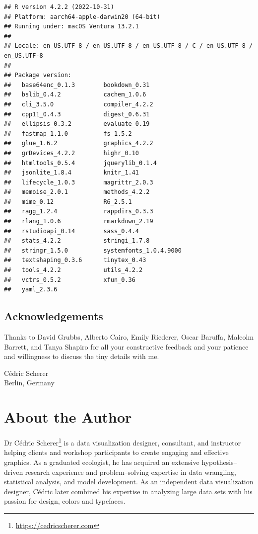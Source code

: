 \documentclass[
]{krantz}
\renewcommand{\href}[2]{#2\footnote{\url{#1}}}
\begin{document}
\begin{verbatim}
## R version 4.2.2 (2022-10-31)
## Platform: aarch64-apple-darwin20 (64-bit)
## Running under: macOS Ventura 13.2.1
## 
## Locale: en_US.UTF-8 / en_US.UTF-8 / en_US.UTF-8 / C / en_US.UTF-8 / en_US.UTF-8
## 
## Package version:
##   base64enc_0.1.3        bookdown_0.31         
##   bslib_0.4.2            cachem_1.0.6          
##   cli_3.5.0              compiler_4.2.2        
##   cpp11_0.4.3            digest_0.6.31         
##   ellipsis_0.3.2         evaluate_0.19         
##   fastmap_1.1.0          fs_1.5.2              
##   glue_1.6.2             graphics_4.2.2        
##   grDevices_4.2.2        highr_0.10            
##   htmltools_0.5.4        jquerylib_0.1.4       
##   jsonlite_1.8.4         knitr_1.41            
##   lifecycle_1.0.3        magrittr_2.0.3        
##   memoise_2.0.1          methods_4.2.2         
##   mime_0.12              R6_2.5.1              
##   ragg_1.2.4             rappdirs_0.3.3        
##   rlang_1.0.6            rmarkdown_2.19        
##   rstudioapi_0.14        sass_0.4.4            
##   stats_4.2.2            stringi_1.7.8         
##   stringr_1.5.0          systemfonts_1.0.4.9000
##   textshaping_0.3.6      tinytex_0.43          
##   tools_4.2.2            utils_4.2.2           
##   vctrs_0.5.2            xfun_0.36             
##   yaml_2.3.6
\end{verbatim}

\hypertarget{acknowledgements}{%
\section*{Acknowledgements}\label{acknowledgements}}


Thanks to David Grubbs, Alberto Cairo, Emily Riederer, Oscar Baruffa, Malcolm Barrett, and Tanya Shapiro for all your constructive feedback and your patience and willingness to discuss the tiny details with me.

\begin{flushright}
Cédric Scherer\\
Berlin, Germany
\end{flushright}

\hypertarget{about-the-author}{%
\chapter*{About the Author}\label{about-the-author}}


\href{https://cedricscherer.com}{Dr Cédric Scherer} is a data visualization designer, consultant, and instructor helping clients and workshop participants to create engaging and effective graphics. As a graduated ecologist, he has acquired an extensive hypothesis--driven research experience and problem--solving expertise in data wrangling, statistical analysis, and model development. As an independent data visualization designer, Cédric later combined his expertise in analyzing large data sets with his passion for design, colors and typefaces.
\end{document}
